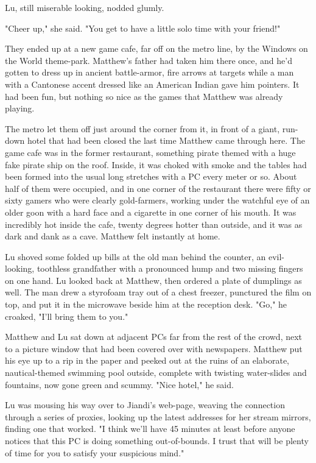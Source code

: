 Lu, still miserable looking, nodded glumly.

"Cheer up," she said. "You get to have a little solo time with your
friend!"

They ended up at a new game cafe, far off on the metro line, by the
Windows on the World theme-park. Matthew's father had taken him
there once, and he'd gotten to dress up in ancient battle-armor,
fire arrows at targets while a man with a Cantonese accent dressed
like an American Indian gave him pointers. It had been fun, but
nothing so nice as the games that Matthew was already playing.

The metro let them off just around the corner from it, in front of
a giant, run-down hotel that had been closed the last time Matthew
came through here. The game cafe was in the former restaurant,
something pirate themed with a huge fake pirate ship on the roof.
Inside, it was choked with smoke and the tables had been formed
into the usual long stretches with a PC every meter or so. About
half of them were occupied, and in one corner of the restaurant
there were fifty or sixty gamers who were clearly gold-farmers,
working under the watchful eye of an older goon with a hard face
and a cigarette in one corner of his mouth. It was incredibly hot
inside the cafe, twenty degrees hotter than outside, and it was as
dark and dank as a cave. Matthew felt instantly at home.

Lu shoved some folded up bills at the old man behind the counter,
an evil-looking, toothless grandfather with a pronounced hump and
two missing fingers on one hand. Lu looked back at Matthew, then
ordered a plate of dumplings as well. The man drew a styrofoam tray
out of a chest freezer, punctured the film on top, and put it in
the microwave beside him at the reception desk. "Go," he croaked,
"I'll bring them to you."

Matthew and Lu sat down at adjacent PCs far from the rest of the
crowd, next to a picture window that had been covered over with
newspapers. Matthew put his eye up to a rip in the paper and peeked
out at the ruins of an elaborate, nautical-themed swimming pool
outside, complete with twisting water-slides and fountains, now
gone green and scummy. "Nice hotel," he said.

Lu was mousing his way over to Jiandi's web-page, weaving the
connection through a series of proxies, looking up the latest
addresses for her stream mirrors, finding one that worked. "I think
we'll have 45 minutes at least before anyone notices that this PC
is doing something out-of-bounds. I trust that will be plenty of
time for you to satisfy your suspicious mind."

